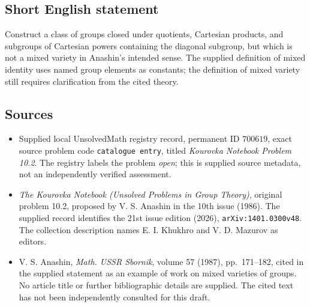 \documentclass[11pt]{article}
\begin{document}
\subsection{Short English statement}
Construct a class of groups closed under quotients, Cartesian products, and subgroups of Cartesian powers containing the diagonal subgroup, but which is not a mixed variety in Anashin's intended sense. The supplied definition of mixed identity uses named group elements as constants; the definition of mixed variety still requires clarification from the cited theory.
\subsection{Sources}
\begin{itemize}
\item Supplied local UnsolvedMath registry record, permanent ID \(700619\), exact source problem code \texttt{catalogue entry}, titled \emph{Kourovka Notebook Problem 10.2}. The registry labels the problem \emph{open}; this is supplied source metadata, not an independently verified assessment.
\item \emph{The Kourovka Notebook (Unsolved Problems in Group Theory)}, original problem 10.2, proposed by V. S. Anashin in the 10th issue (1986). The supplied record identifies the 21st issue edition (2026), \texttt{arXiv:1401.0300v48}. The collection description names E. I. Khukhro and V. D. Mazurov as editors.
\item V. S. Anashin, \emph{Math. USSR Sbornik}, volume 57 (1987), pp.\ 171--182, cited in the supplied statement as an example of work on mixed varieties of groups. No article title or further bibliographic details are supplied. The cited text has not been independently consulted for this draft.
\end{itemize}
\end{document}
